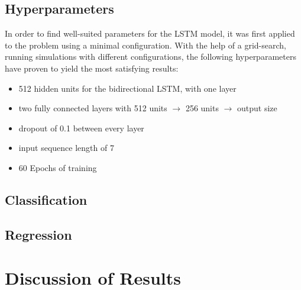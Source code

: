 \subsection{Hyperparameters}
In order to find well-suited parameters for the LSTM model, it was first applied to the problem using a minimal configuration. With the help of a grid-search, running simulations with different configurations, the following hyperparameters have proven to yield the most satisfying results:
\begin{itemize}
	\item 512 hidden units for the bidirectional LSTM, with one layer
	\item two fully connected layers with 512 units $\rightarrow$ 256 units $\rightarrow$ output size
	\item dropout of 0.1 between every layer
	\item input sequence length of 7
	\item 60 Epochs of training
\end{itemize}



\subsection{Classification \label{sec:results-classification}}

\subsection{Regression \label{sec:results-regression}}

\section{Discussion of Results}
